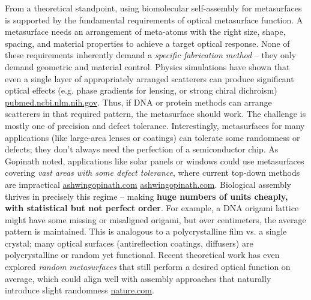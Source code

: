 \documentclass[11pt,a4paper]{article}
\begin{document}
From a theoretical standpoint, using biomolecular self-assembly for metasurfaces is supported by the fundamental requirements of optical metasurface function. A metasurface needs an arrangement of meta-atoms with the right size, shape, spacing, and material properties to achieve a target optical response. None of these requirements inherently demand a \emph{specific fabrication method} -- they only demand geometric and material control. Physics simulations have shown that even a single layer of appropriately arranged scatterers can produce significant optical effects (e.g. phase gradients for lensing, or strong chiral dichroism) \href{https://pubmed.ncbi.nlm.nih.gov/38859241/#:~:text=response in a much more,simulate the optical properties but}{pubmed.ncbi.nlm.nih.gov}. Thus, if DNA or protein methods can arrange scatterers in that required pattern, the metasurface should work. The challenge is mostly one of precision and defect tolerance. Interestingly, metasurfaces for many applications (like large-area lenses or coatings) can tolerate some randomness or defects; they don't always need the perfection of a semiconductor chip. As Gopinath noted, applications like solar panels or windows could use metasurfaces covering \emph{vast areas with some defect tolerance}, where current top-down methods are impractical \href{https://ashwingopinath.com/large-area-nanopatterning#:~:text=A unique class of second,of metal nanoparticles that passively}{ashwingopinath.com} \href{https://ashwingopinath.com/large-area-nanopatterning#:~:text=while there are niche applications,be ideal for this purpose}{ashwingopinath.com}. Biological assembly thrives in precisely this regime -- making \textbf{huge numbers of units cheaply, with statistical but not perfect order}. For example, a DNA origami lattice might have some missing or misaligned origami, but over centimeters, the average pattern is maintained. This is analogous to a polycrystalline film vs. a single crystal; many optical surfaces (antireflection coatings, diffusers) are polycrystalline or random yet functional. Recent theoretical work has even explored \emph{random metasurfaces} that still perform a desired optical function on average, which could align well with assembly approaches that naturally introduce slight randomness \href{https://www.nature.com/articles/s41598-018-25488-4#:~:text=On the design of random,defined phase function}{nature.com}.
\end{document}
